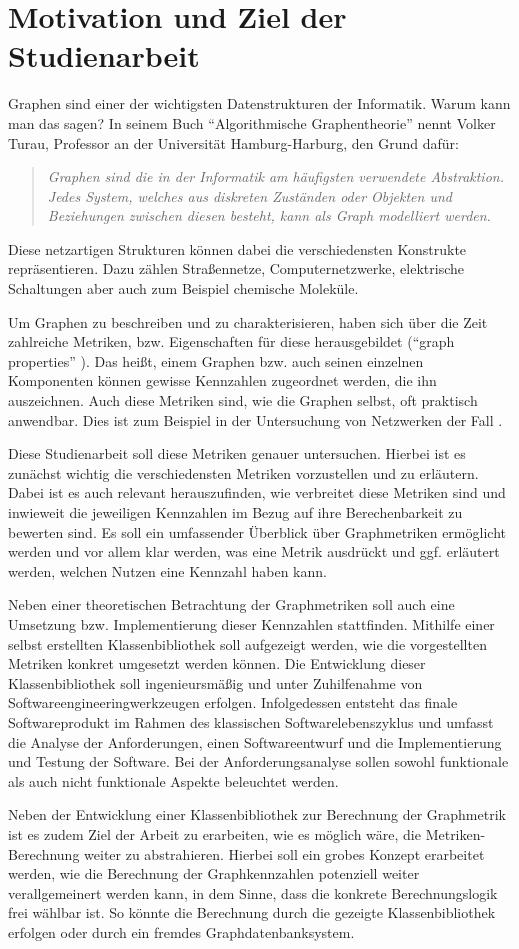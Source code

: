 \documentclass[a4paper,12pt,ngerman,chapterprefix=false,listof=totoc,bibliography=totoc]{scrreprt}
\newcommand{\zitat}[2]{
	\begin{quote}
		\textit{#1} \cite{#2}
	\end{quote}
}
\begin{document}
\section{Motivation und Ziel der Studienarbeit}{
Graphen sind einer der wichtigsten Datenstrukturen der Informatik. Warum kann man das sagen? In seinem Buch "`Algorithmische Graphentheorie"' nennt Volker Turau, Professor an der Universität Hamburg-Harburg, den Grund dafür:
\zitat{Graphen sind die in der Informatik am häufigsten verwendete Abstraktion. Jedes System, welches aus diskreten Zuständen oder Objekten und Beziehungen zwischen diesen besteht, kann als Graph modelliert werden.}{turau_algorithmische_2004}
Diese netzartigen Strukturen können dabei die verschiedensten Konstrukte repräsentieren. Dazu zählen Straßennetze, Computernetzwerke, elektrische Schaltungen aber auch zum Beispiel chemische Moleküle. \cite{tittmann_graphentheorie_2019}

Um Graphen zu beschreiben und zu charakterisieren, haben sich über die Zeit zahlreiche Metriken, bzw. Eigenschaften für diese herausgebildet ("`graph properties"' \cite{lovasz_large_2012}). Das heißt, einem Graphen bzw. auch seinen einzelnen Komponenten können gewisse Kennzahlen zugeordnet werden, die ihn auszeichnen. Auch diese Metriken sind, wie die Graphen selbst, oft praktisch anwendbar. Dies ist zum Beispiel in der Untersuchung von Netzwerken der Fall \cite{ellens_graph_2013}.

Diese Studienarbeit soll diese Metriken genauer untersuchen. Hierbei ist es zunächst wichtig die verschiedensten Metriken vorzustellen und zu erläutern. Dabei ist es auch relevant herauszufinden, wie verbreitet diese Metriken sind und inwieweit die jeweiligen Kennzahlen im Bezug auf ihre Berechenbarkeit zu bewerten sind. Es soll ein umfassender Überblick über Graphmetriken ermöglicht werden und vor allem klar werden, was eine Metrik ausdrückt und ggf. erläutert werden, welchen Nutzen eine Kennzahl haben kann.

Neben einer theoretischen Betrachtung der Graphmetriken soll auch eine Umsetzung bzw. Implementierung dieser Kennzahlen stattfinden. Mithilfe einer selbst erstellten Klassenbibliothek soll aufgezeigt werden, wie die vorgestellten Metriken konkret umgesetzt werden können. Die Entwicklung dieser Klassenbibliothek soll ingenieursmäßig und unter Zuhilfenahme von Softwareengineeringwerkzeugen erfolgen. Infolgedessen entsteht das finale Softwareprodukt im Rahmen des klassischen Softwarelebenszyklus und umfasst die Analyse der Anforderungen, einen Softwareentwurf und die Implementierung und Testung der Software. Bei der Anforderungsanalyse sollen sowohl funktionale als auch nicht funktionale Aspekte beleuchtet werden. \cite{balzert_lehrbuch_2009,balzert_lehrbuch_2011}

Neben der Entwicklung einer Klassenbibliothek zur Berechnung der Graphmetrik ist es zudem Ziel der Arbeit zu erarbeiten, wie es möglich wäre, die Metriken-Berechnung weiter zu abstrahieren. Hierbei soll ein grobes Konzept erarbeitet werden, wie die Berechnung der Graphkennzahlen potenziell weiter verallgemeinert werden kann, in dem Sinne, dass die konkrete Berechnungslogik frei wählbar ist. So könnte die Berechnung durch die gezeigte Klassenbibliothek erfolgen oder durch ein fremdes Graphdatenbanksystem.
}
\end{document}
